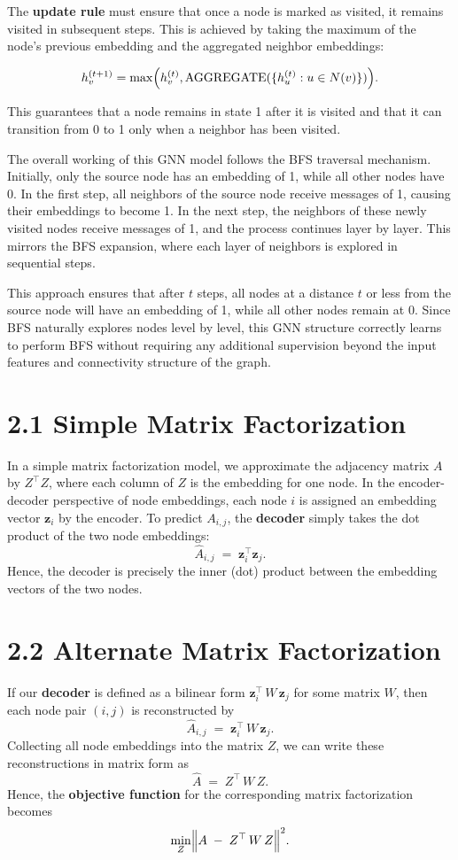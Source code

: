 \documentclass[a4paper,12pt]{article}
\begin{document}
The \textbf{update rule} must ensure that once a node is marked as visited, it remains visited in subsequent steps. This is achieved by taking the maximum of the node's previous embedding and the aggregated neighbor embeddings:

\[
h_v^{(t+1)} = \max\Bigl(h_v^{(t)}, \text{AGGREGATE}(\{h_u^{(t)} : u \in N(v)\})\Bigr).
\]

This guarantees that a node remains in state 1 after it is visited and that it can transition from 0 to 1 only when a neighbor has been visited.

The overall working of this GNN model follows the BFS traversal mechanism. Initially, only the source node has an embedding of 1, while all other nodes have 0. In the first step, all neighbors of the source node receive messages of 1, causing their embeddings to become 1. In the next step, the neighbors of these newly visited nodes receive messages of 1, and the process continues layer by layer. This mirrors the BFS expansion, where each layer of neighbors is explored in sequential steps.

This approach ensures that after \( t \) steps, all nodes at a distance \( t \) or less from the source node will have an embedding of 1, while all other nodes remain at 0. Since BFS naturally explores nodes level by level, this GNN structure correctly learns to perform BFS without requiring any additional supervision beyond the input features and connectivity structure of the graph.


\section*{2.1 Simple Matrix Factorization}
In a simple matrix factorization model, we approximate the adjacency matrix \(A\)
by \(Z^{\top}Z\), where each column of \(Z\) is the embedding for one node. In
the encoder-decoder perspective of node embeddings, each node \(i\) is assigned
an embedding vector \(\mathbf{z}_i\) by the encoder. To predict \(A_{i,j}\), the
\textbf{decoder} simply takes the dot product of the two node embeddings:
\[
\hat{A}_{i,j} \;=\;\mathbf{z}_i^\top \mathbf{z}_j.
\]
Hence, the decoder is precisely the inner (dot) product between the embedding
vectors of the two nodes.

\section*{2.2 Alternate Matrix Factorization}
If our \textbf{decoder} is defined as a bilinear form \( \mathbf{z}_i^{\top} \, W \, \mathbf{z}_j \)
for some matrix \(W\), then each node pair \((i, j)\) is reconstructed by
\[
\hat{A}_{i,j} \;=\;\mathbf{z}_i^{\top}\,W\,\mathbf{z}_j.
\]
Collecting all node embeddings into the matrix \(Z\), we can write these reconstructions
in matrix form as
\[
\hat{A} \;=\;Z^{\top}\,W\,Z.
\]
Hence, the \textbf{objective function} for the corresponding matrix factorization becomes
\[
\min_{Z} \Bigl\lVert A \;-\;Z^{\top}\,W\,Z \Bigr\rVert^{2}.
\]
\end{document}
